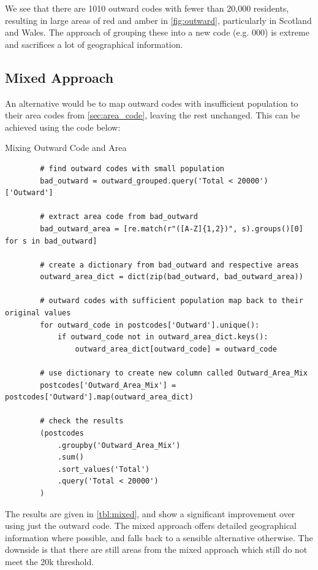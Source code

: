 \documentclass{article}
\begin{document}
We see that there are 1010 outward codes with fewer than 20,000 residents, resulting in large areas of red and amber in \cref{fig:outward}, particularly in Scotland and Wales. The approach of grouping these into a new code (e.g. 000) is extreme and sacrifices a lot of geographical information. 

\subsection{Mixed Approach}
An alternative would be to map outward codes with insufficient population to their area codes from \cref{sec:area_code}, leaving the rest unchanged. This can be achieved using the code below:

\begin{mybox}[colbacktitle=green]{Mixing Outward Code and Area}
    \begin{verbatim}   
        # find outward codes with small population
        bad_outward = outward_grouped.query('Total < 20000')['Outward']

        # extract area code from bad_outward
        bad_outward_area = [re.match(r"([A-Z]{1,2})", s).groups()[0] for s in bad_outward]

        # create a dictionary from bad_outward and respective areas
        outward_area_dict = dict(zip(bad_outward, bad_outward_area))

        # outward codes with sufficient population map back to their original values
        for outward_code in postcodes['Outward'].unique():
            if outward_code not in outward_area_dict.keys():
                outward_area_dict[outward_code] = outward_code

        # use dictionary to create new column called Outward_Area_Mix
        postcodes['Outward_Area_Mix'] = postcodes['Outward'].map(outward_area_dict)
        
        # check the results
        (postcodes
            .groupby('Outward_Area_Mix')
            .sum()
            .sort_values('Total')
            .query('Total < 20000')
        )
    \end{verbatim}
\end{mybox}

The results are given in \cref{tbl:mixed}, and show a significant improvement over using just the outward code. The mixed approach offers detailed geographical information where possible, and falls back to a sensible alternative otherwise. The downside is that there are still areas from the mixed approach which still do not meet the 20k threshold.
\end{document}
